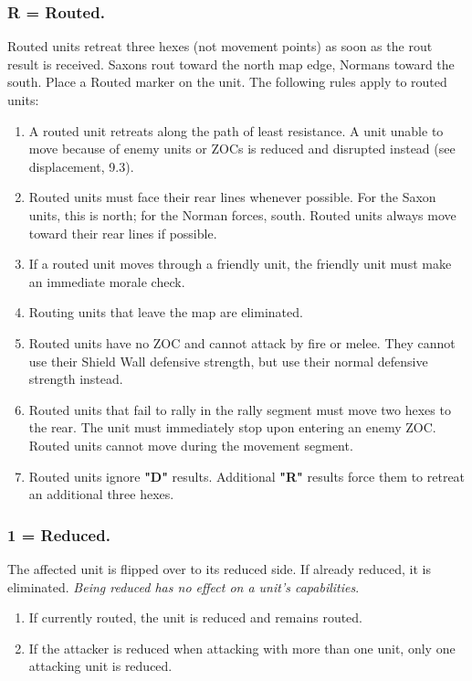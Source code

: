 \subsubsection[Routed]{R = Routed.} Routed units retreat three hexes (not movement points) as soon as the rout result is received. Saxons rout toward the north map edge, Normans toward the south. Place a Routed marker on the unit. The following rules apply to routed units:

\begin{enumerate}
  \item A routed unit retreats along the path of least resistance. A unit unable to move because of enemy units or ZOCs is reduced and disrupted instead (see displacement, 9.3).
  \item Routed units must face their rear lines whenever possible. For the Saxon units, this is north; for the Norman forces, south. Routed units always move toward their rear lines if possible.
  \item If a routed unit moves through a friendly unit, the friendly unit must make an immediate morale check.
  \item Routing units that leave the map are eliminated.
  \item Routed units have no ZOC and cannot attack by fire or melee. They cannot use their Shield Wall defensive strength, but use their normal defensive strength instead.
  \item Routed units that fail to rally in the rally segment must move two hexes to the rear. The unit must immediately stop upon entering an enemy ZOC. Routed units cannot move during the movement segment.
  \item Routed units ignore \textbf{"D"} results. Additional \textbf{"R"} results force them to retreat an additional three hexes.
\end{enumerate}

\subsubsection[Reduced]{1 = Reduced.} The affected unit is flipped over to its reduced side. If already reduced, it is eliminated. \textit{Being reduced has no effect on a unit's capabilities}.

\begin{enumerate}
  \item If currently routed, the unit is reduced and remains routed.
  \item If the attacker is reduced when attacking with more than one unit, only one attacking unit is reduced.
\end{enumerate}

